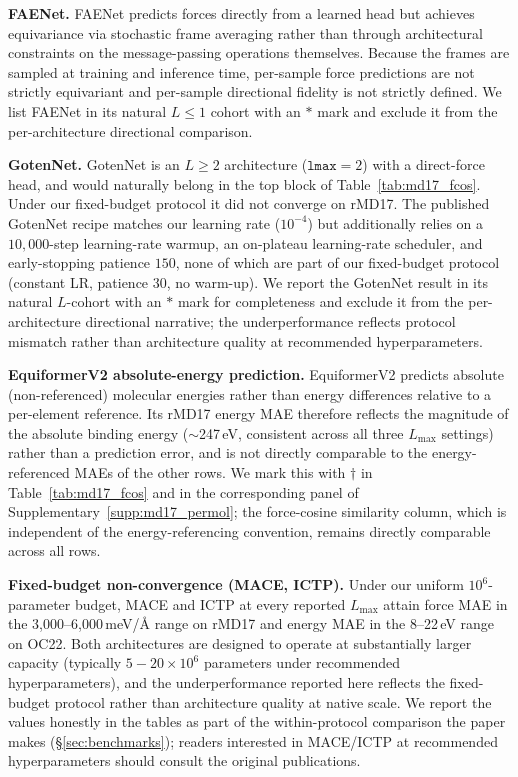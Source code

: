 \textbf{FAENet.} FAENet predicts forces directly from a learned head but achieves equivariance via stochastic frame averaging rather than through architectural constraints on the message-passing operations themselves. Because the frames are sampled at training and inference time, per-sample force predictions are not strictly equivariant and per-sample directional fidelity is not strictly defined. We list FAENet in its natural $L\!\leq\!1$ cohort with an $\ast$ mark and exclude it from the per-architecture directional comparison.

\textbf{GotenNet.} GotenNet is an $L\!\geq\!2$ architecture ($\mathtt{lmax}{=}2$) with a direct-force head, and would naturally belong in the top block of Table~\ref{tab:md17_fcos}. Under our fixed-budget protocol it did not converge on rMD17. The published GotenNet recipe matches our learning rate ($10^{-4}$) but additionally relies on a $10{,}000$-step learning-rate warmup, an on-plateau learning-rate scheduler, and early-stopping patience $150$, none of which are part of our fixed-budget protocol (constant LR, patience $30$, no warm-up). We report the GotenNet result in its natural $L$-cohort with an $\ast$ mark for completeness and exclude it from the per-architecture directional narrative; the underperformance reflects protocol mismatch rather than architecture quality at recommended hyperparameters.

\textbf{EquiformerV2 absolute-energy prediction.} EquiformerV2 predicts absolute (non-referenced) molecular energies rather than energy differences relative to a per-element reference. Its rMD17 energy MAE therefore reflects the magnitude of the absolute binding energy ($\sim$247\,eV, consistent across all three $L_{\max}$ settings) rather than a prediction error, and is not directly comparable to the energy-referenced MAEs of the other rows. We mark this with $\dagger$ in Table~\ref{tab:md17_fcos} and in the corresponding panel of Supplementary~\ref{supp:md17_permol}; the force-cosine similarity column, which is independent of the energy-referencing convention, remains directly comparable across all rows.

\textbf{Fixed-budget non-convergence (MACE, ICTP).} Under our uniform $10^6$-parameter budget, MACE and ICTP at every reported $L_{\max}$ attain force MAE in the 3{,}000--6{,}000\,meV/\AA{} range on rMD17 and energy MAE in the 8--22\,eV range on OC22. Both architectures are designed to operate at substantially larger capacity (typically $5{-}20\times 10^6$ parameters under recommended hyperparameters), and the underperformance reported here reflects the fixed-budget protocol rather than architecture quality at native scale. We report the values honestly in the tables as part of the within-protocol comparison the paper makes (\S\ref{sec:benchmarks}); readers interested in MACE/ICTP at recommended hyperparameters should consult the original publications.

